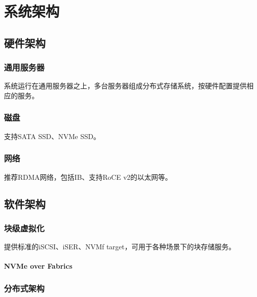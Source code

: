 \chapter{系统架构}

\section{硬件架构}

\subsection{通用服务器}

系统运行在通用服务器之上，多台服务器组成分布式存储系统，按硬件配置提供相应的服务。

\subsection{磁盘}

支持SATA SSD、NVMe SSD。

\subsection{网络}

推荐RDMA网络，包括IB、支持RoCE v2的以太网等。

\section{软件架构}



\subsection{块级虚拟化}

提供标准的iSCSI、iSER、NVMf target，可用于各种场景下的块存储服务。

\subsubsection{NVMe over Fabrics}

\subsection{分布式架构}


